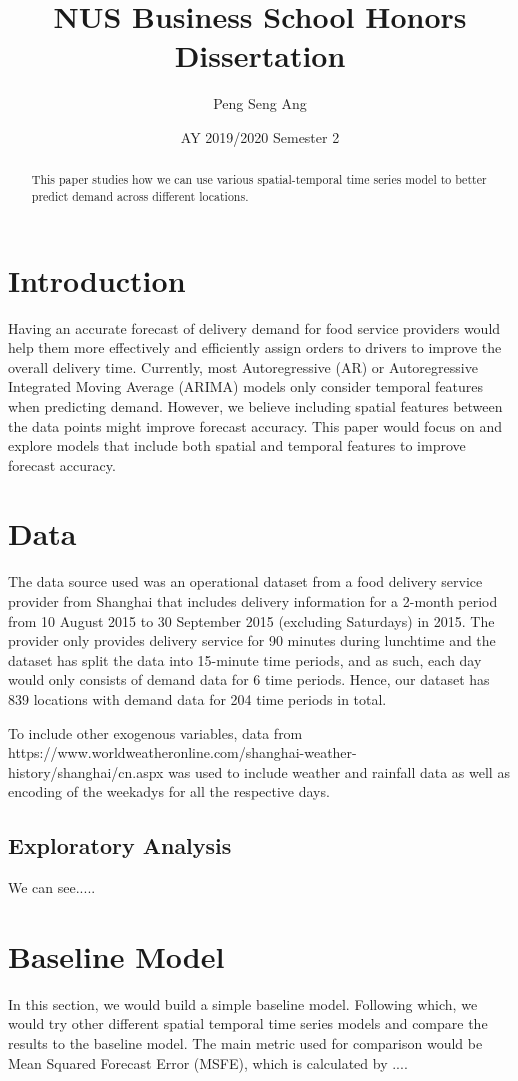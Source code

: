 \documentclass[10pt, letterpaper] {article}
\begin{document}
	\title{NUS Business School Honors Dissertation}
	\author{Peng Seng Ang}
	\date{AY 2019/2020 Semester 2}
	\maketitle
\begin{abstract}
This paper studies how we can use various spatial-temporal time series model to better predict demand across different locations. 
\end{abstract}
\section{Introduction}
Having an accurate forecast of delivery demand for food service providers would help them more effectively and efficiently assign orders to drivers to improve the overall delivery time. Currently, most Autoregressive (AR) or Autoregressive Integrated Moving Average (ARIMA) models only consider temporal features when predicting demand. However, we believe including spatial features between the data points might improve forecast accuracy. This paper would focus on and explore models that include both spatial and temporal features to improve forecast accuracy. 
\section{Data}
The data source used was an operational dataset from a food delivery service provider from Shanghai that includes delivery information for a 2-month period from 10 August 2015 to 30 September 2015 (excluding Saturdays) in 2015. The provider only provides delivery service for 90 minutes during lunchtime and the dataset has split the data into 15-minute time periods, and as such, each day would only consists of demand data for 6 time periods. Hence, our dataset has 839 locations with demand data for 204 time periods in total. 

To include other exogenous variables, data from https://www.worldweatheronline.com/shanghai-weather-history/shanghai/cn.aspx was used to include weather and rainfall data as well as encoding of the weekadys for all the respective days. 

\subsection{Exploratory Analysis}
We can see.....
\section{Baseline Model}
In this section, we would build a simple baseline model. Following which, we would try other different spatial temporal time series models and compare the results to the baseline model. The main metric used for comparison would be Mean Squared Forecast Error (MSFE), which is calculated by ....
\end{document}
